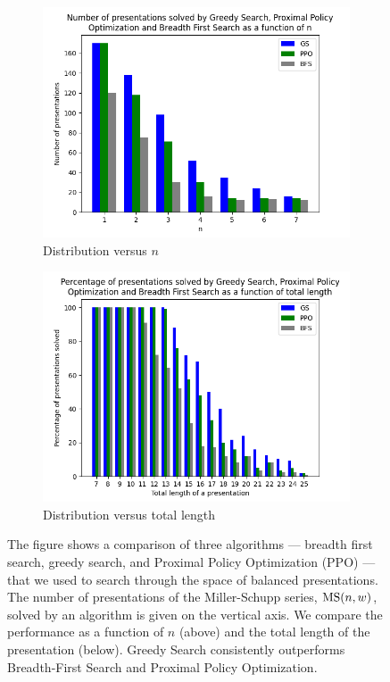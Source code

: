 \begin{figure}
	\centering
	\begin{subfigure}[b]{0.5\textwidth}
		\includegraphics[width=1.1\textwidth]{fig/performance_vs_n.png}
		\caption{Distribution versus $n$}
		\label{fig:performance_vs_n}
	\end{subfigure}
	
	\begin{subfigure}[b]{0.5\textwidth}
		\centering
		\includegraphics[width=1.1\textwidth]{fig/performance_vs_length.png}
		\caption{Distribution versus total length}
		\label{fig:performance_vs_length}
	\end{subfigure}
	\caption{The figure shows a comparison of three algorithms --- breadth first search, greedy search, and Proximal Policy Optimization (PPO) --- that we used to search through the space of balanced presentations. The number of presentations of the Miller-Schupp series, $\text{MS}(n, w)$, solved by an algorithm is given on the vertical axis. We compare the performance as a function of $n$ (above) and the total length of the presentation (below). Greedy Search consistently outperforms Breadth-First Search and Proximal Policy Optimization.}
	\label{fig:performance}
\end{figure}

